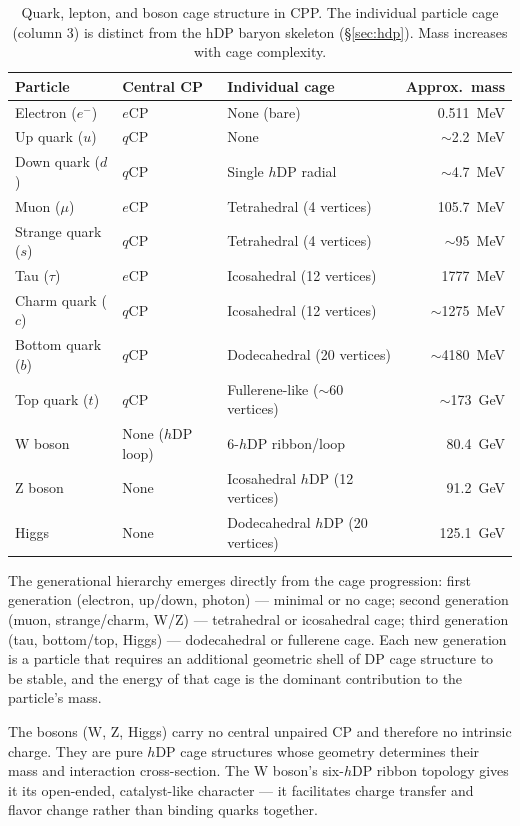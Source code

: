 \documentclass[12pt]{article}
\newcommand{\eCP}{e\mathrm{CP}}
\newcommand{\qCP}{q\mathrm{CP}}
\newcommand{\hDP}{h\mathrm{DP}}
\begin{document}
\begin{table}[ht]
\centering
\caption{Quark, lepton, and boson cage structure in CPP.  The
individual particle cage (column 3) is distinct from the hDP baryon
skeleton (§\ref{sec:hdp}).  Mass increases with cage complexity.}
\label{tab:cages}
\renewcommand{\arraystretch}{1.35}
\begin{tabular}{@{}lllr@{}}
\toprule
Particle & Central CP & Individual cage & Approx.\ mass \\
\midrule
Electron ($e^-$) & $\eCP$ & None (bare) & 0.511~MeV \\
Up quark ($u$) & $\qCP$ & None & $\sim$2.2~MeV \\
Down quark ($d$) & $\qCP$ & Single $\hDP$ radial & $\sim$4.7~MeV \\
Muon ($\mu$) & $\eCP$ & Tetrahedral (4 vertices) & 105.7~MeV \\
Strange quark ($s$) & $\qCP$ & Tetrahedral (4 vertices) & $\sim$95~MeV \\
Tau ($\tau$) & $\eCP$ & Icosahedral (12 vertices) & 1777~MeV \\
Charm quark ($c$) & $\qCP$ & Icosahedral (12 vertices) & $\sim$1275~MeV \\
Bottom quark ($b$) & $\qCP$ & Dodecahedral (20 vertices) & $\sim$4180~MeV \\
Top quark ($t$) & $\qCP$ & Fullerene-like ($\sim$60 vertices) & $\sim$173~GeV \\
\midrule
W boson & None ($\hDP$ loop) & 6-$\hDP$ ribbon/loop & 80.4~GeV \\
Z boson & None & Icosahedral $\hDP$ (12 vertices) & 91.2~GeV \\
Higgs & None & Dodecahedral $\hDP$ (20 vertices) & 125.1~GeV \\
\bottomrule
\end{tabular}
\end{table}

The generational hierarchy emerges directly from the cage progression:
first generation (electron, up/down, photon) --- minimal or no cage;
second generation (muon, strange/charm, W/Z) --- tetrahedral or
icosahedral cage; third generation (tau, bottom/top, Higgs) ---
dodecahedral or fullerene cage.  Each new generation is a particle
that requires an additional geometric shell of DP cage structure to
be stable, and the energy of that cage is the dominant contribution
to the particle's mass.

The bosons (W, Z, Higgs) carry no central unpaired CP and therefore
no intrinsic charge.  They are pure $\hDP$ cage structures whose
geometry determines their mass and interaction cross-section.  The
W boson's six-$\hDP$ ribbon topology gives it its open-ended,
catalyst-like character --- it facilitates charge transfer and flavor
change rather than binding quarks together.
\end{document}
